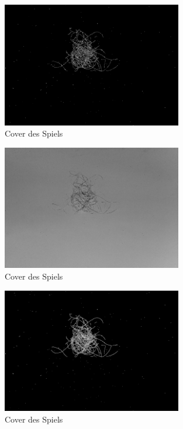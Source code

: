 \documentclass[german,a4paper, 12pt]{scrartcl}
\begin{document}
\begin{figure}
	\centering
	\includegraphics[width=0.7\textwidth]{figBina/04edges.png}
	\caption[]{Cover des Spiels}
	\label{img:Bina01}
\end{figure}
\begin{figure}
	\centering
	\includegraphics[width=0.7\textwidth]{figBina/05gray.png}
	\caption[]{Cover des Spiels}
	\label{img:Bina01}
\end{figure}
\begin{figure}
	\centering
	\includegraphics[width=0.7\textwidth]{figBina/05intenstiy.png}
	\caption[]{Cover des Spiels}
	\label{img:Bina01}
\end{figure}
\end{document}
